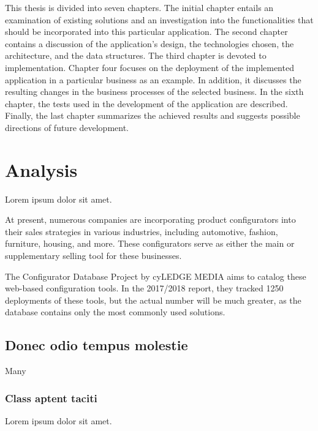 This thesis is divided into seven chapters. The initial chapter entails an examination of existing solutions and an investigation into the functionalities that should be incorporated into this particular application. The second chapter contains a discussion of the application's design, the technologies chosen, the architecture, and the data structures. The third chapter is devoted to implementation. Chapter four focuses on the deployment of the implemented application in a particular business as an example. In addition, it discusses the resulting changes in the business processes of the selected business. In the sixth chapter, the tests used in the development of the application are described. Finally, the last chapter summarizes the achieved results and suggests possible directions of future development.

\chapter{Analysis}

\begin{chapterabstract}
	Lorem ipsum dolor sit amet. 
\end{chapterabstract}


At present, numerous companies are incorporating product configurators into their sales strategies in various industries, including automotive, fashion, furniture, housing, and more. These configurators serve as either the main or supplementary selling tool for these businesses.

The Configurator Database Project by cyLEDGE MEDIA aims to catalog these web-based configuration tools. In the 2017/2018 report, they tracked 1250 deployments of these tools, but the actual number will be much greater, as the database contains only the most commonly used solutions. \cite{cyLEDGE2018}

\section{Donec odio tempus molestie}

Many

\subsection{Class aptent taciti}

Lorem ipsum dolor sit amet.